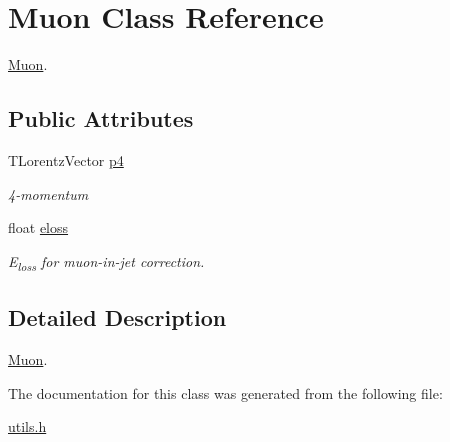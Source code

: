\hypertarget{classMuon}{}\section{Muon Class Reference}
\label{classMuon}


\mbox{\hyperlink{classMuon}{Muon}}.  


\subsection*{Public Attributes}
\begin{DoxyCompactItemize}
\item 
\mbox{\label{classMuon_a26670be8eb7e5e31c9b60b71bdaacd53}} 
T\+Lorentz\+Vector \mbox{\hyperlink{classMuon_a26670be8eb7e5e31c9b60b71bdaacd53}{p4}}
\begin{DoxyCompactList}\small\item\em 4-\/momentum \end{DoxyCompactList}\item 
\mbox{\label{classMuon_ae9573fba58d32cbad7ca1748603a7295}} 
float \mbox{\hyperlink{classMuon_ae9573fba58d32cbad7ca1748603a7295}{eloss}}
\begin{DoxyCompactList}\small\item\em E\textsubscript{loss} for muon-\/in-\/jet correction. \end{DoxyCompactList}\end{DoxyCompactItemize}


\subsection{Detailed Description}
\mbox{\hyperlink{classMuon}{Muon}}. 

The documentation for this class was generated from the following file\+:\begin{DoxyCompactItemize}
\item 
\mbox{\hyperlink{utils_8h}{utils.\+h}}\end{DoxyCompactItemize}

